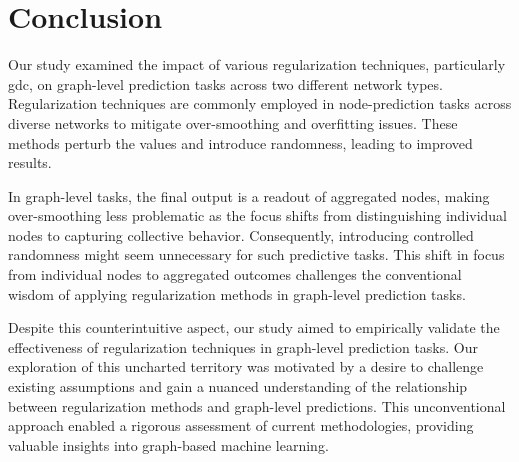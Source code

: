 \section{Conclusion}

Our study examined the impact of various regularization techniques, particularly \ac{gdc}, on graph-level prediction tasks across two different network types. Regularization techniques are commonly employed in node-prediction tasks across diverse networks to mitigate over-smoothing and overfitting issues. These methods perturb the values and introduce randomness, leading to improved results.

In graph-level tasks, the final output is a readout of aggregated nodes, making over-smoothing less problematic as the focus shifts from distinguishing individual nodes to capturing collective behavior. Consequently, introducing controlled randomness might seem unnecessary for such predictive tasks. This shift in focus from individual nodes to aggregated outcomes challenges the conventional wisdom of applying regularization methods in graph-level prediction tasks.

Despite this counterintuitive aspect, our study aimed to empirically validate the effectiveness of regularization techniques in graph-level prediction tasks. Our exploration of this uncharted territory was motivated by a desire to challenge existing assumptions and gain a nuanced understanding of the relationship between regularization methods and graph-level predictions. This unconventional approach enabled a rigorous assessment of current methodologies, providing valuable insights into graph-based machine learning.

